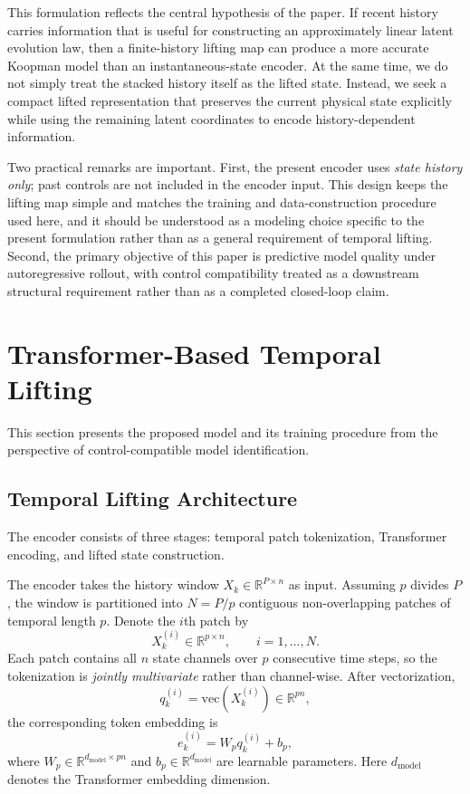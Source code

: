 \documentclass[journal]{IEEEtran}
\begin{document}
This formulation reflects the central hypothesis of the paper. If recent history carries information that is useful for constructing an approximately linear latent evolution law, then a finite-history lifting map can produce a more accurate Koopman model than an instantaneous-state encoder. At the same time, we do not simply treat the stacked history itself as the lifted state. Instead, we seek a compact lifted representation that preserves the current physical state explicitly while using the remaining latent coordinates to encode history-dependent information.

Two practical remarks are important. First, the present encoder uses \emph{state history only}; past controls are not included in the encoder input. This design keeps the lifting map simple and matches the training and data-construction procedure used here, and it should be understood as a modeling choice specific to the present formulation rather than as a general requirement of temporal lifting. Second, the primary objective of this paper is predictive model quality under autoregressive rollout, with control compatibility treated as a downstream structural requirement rather than as a completed closed-loop claim.

\section{Transformer-Based Temporal Lifting}
\label{sec:methodology}

This section presents the proposed model and its training procedure from the perspective of control-compatible model identification.

\subsection{Temporal Lifting Architecture}
\label{sec:temporal_lifting}

The encoder consists of three stages: temporal patch tokenization, Transformer encoding, and lifted state construction.

The encoder takes the history window $X_k \in \mathbb{R}^{P\times n}$ as input. Assuming $p$ divides $P$, the window is partitioned into $N=P/p$ contiguous non-overlapping patches of temporal length $p$. Denote the $i$th patch by
\begin{equation}
    X_k^{(i)} \in \mathbb{R}^{p\times n}, \qquad i=1,\ldots,N.
\end{equation}
Each patch contains all $n$ state channels over $p$ consecutive time steps, so the tokenization is \emph{jointly multivariate} rather than channel-wise. After vectorization,
\begin{equation}
    q_k^{(i)} = \mathrm{vec}(X_k^{(i)}) \in \mathbb{R}^{pn},
\end{equation}
the corresponding token embedding is
\begin{equation}
    e_k^{(i)} = W_p q_k^{(i)} + b_p,
    \label{eq:patch_embedding}
\end{equation}
where $W_p \in \mathbb{R}^{d_{\mathrm{model}}\times pn}$ and $b_p \in \mathbb{R}^{d_{\mathrm{model}}}$ are learnable parameters. Here $d_{\mathrm{model}}$ denotes the Transformer embedding dimension.
\end{document}
